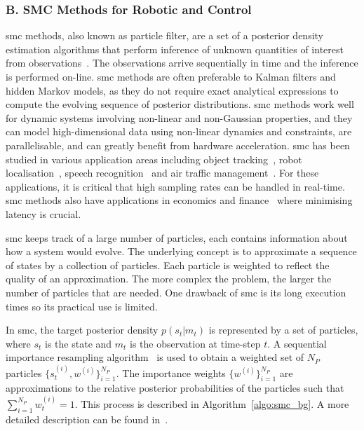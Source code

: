 \subsubsection{B. SMC Methods for Robotic and Control}
\label{sec:smc}

\gls{smc} methods, also known as particle filter, are a set of a posterior density estimation algorithms that perform inference of unknown quantities of interest from observations~\cite{doucet01}.
The observations arrive sequentially in time and the inference is performed on-line.
\gls{smc} methods are often preferable to Kalman filters and hidden Markov models, as they do not require exact analytical expressions to compute the evolving sequence of posterior distributions.
\gls{smc} methods work well for dynamic systems involving non-linear and non-Gaussian properties, and they can model high-dimensional data using non-linear dynamics and constraints, are parallelisable, and can greatly benefit from hardware acceleration.
\gls{smc} has been studied in various application areas including object tracking~\cite{happe11}, robot localisation~\cite{montemerlo02}, speech recognition~\cite{vermaak02} and air traffic management~\cite{kantas09,eele11}.
For these applications, it is critical that high sampling rates can be handled in real-time.
\gls{smc} methods also have applications in economics and finance~\cite{creal12} where minimising latency is crucial.

\gls{smc} keeps track of a large number of particles, each contains information about how a system would evolve.
The underlying concept is to approximate a sequence of states by a collection of particles.
Each particle is weighted to reflect the quality of an approximation.
The more complex the problem, the larger the number of particles that are needed.
One drawback of \gls{smc} is its long execution times so its practical use is limited.

In \gls{smc}, the target posterior density $p(s_t|m_t)$ is represented by a set of particles, where $s_t$ is the state and $m_t$ is the observation at time-step $t$.
A sequential importance resampling algorithm~\cite{gordon93} is used to obtain a weighted set of $N_P$ particles $\{s_t^{(i)},w^{(i)}\}^{N_P}_{i=1}$.
The importance weights $\{w^{(i)}\}^{N_P}_{i=1}$ are approximations to the relative posterior probabilities of the particles such that $\sum^{N_P}_{i=1}w^{(i)}_t = 1$.
This process is described in Algorithm~\ref{algo:smc_bg}.
A more detailed description can be found in~\cite{doucet01}. 

